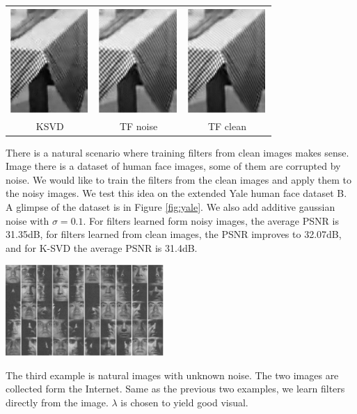 \documentclass[a4paper]{article}
\begin{document}
\begin{center}
\label{fig:detail}
\begin{tabular}{c c c}
\includegraphics[width=3cm]{./figures/4_7.eps} & \includegraphics[width=3cm]{./figures/4_8.eps} &\includegraphics[width=3cm]{./figures/4_6.eps}\\
KSVD & TF noise & TF clean \\
\end{tabular}
\end{center}
There is a natural scenario where training filters from clean images makes sense. Image there is a dataset of human face images, some of them are corrupted by noise. We would like to train the filters from the clean images and apply them to the noisy images. We test this idea on the extended Yale human face dataset B. A glimpse of the dataset is in Figure \ref{fig:yale}. We also add additive gaussian noise with $\sigma=0.1$. For filters learned form noisy images, the average PSNR is 31.35dB, for filters learned from clean images, the PSNR improves to 32.07dB, and for K-SVD the average PSNR is 31.4dB.
\begin{center}
\label{fig:yale}
\includegraphics[width=6cm]{./figures/3_2.eps}
\end{center}
The third example is natural images with unknown noise. The two images are collected form the Internet. Same as the previous two examples, we learn filters directly from the image. $\lambda$ is chosen to yield good visual. 
\end{document}
